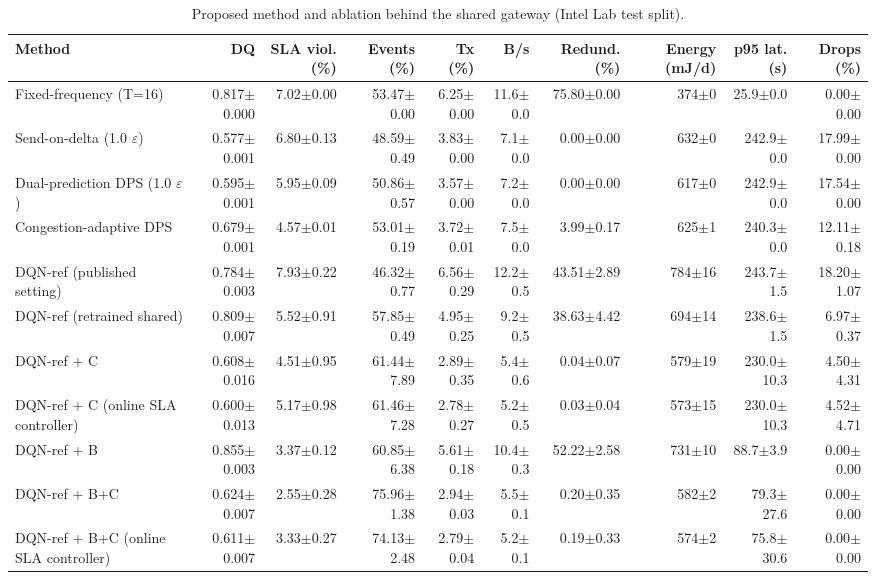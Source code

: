 \begin{table}[t]
\centering
\caption{Proposed method and ablation behind the shared gateway (Intel Lab test split).}
\label{tab:ablation}
\footnotesize
\begin{tabular}{lrrrrrrrrr}
\toprule
Method & DQ & SLA viol. (\%) & Events (\%) & Tx (\%) & B/s & Redund. (\%) & Energy (mJ/d) & p95 lat. (s) & Drops (\%) \\
\midrule
Fixed-frequency (T=16) & 0.817$\pm$0.000 & 7.02$\pm$0.00 & 53.47$\pm$0.00 & 6.25$\pm$0.00 & 11.6$\pm$0.0 & 75.80$\pm$0.00 & 374$\pm$0 & 25.9$\pm$0.0 & 0.00$\pm$0.00 \\
Send-on-delta (1.0 $\varepsilon$) & 0.577$\pm$0.001 & 6.80$\pm$0.13 & 48.59$\pm$0.49 & 3.83$\pm$0.00 & 7.1$\pm$0.0 & 0.00$\pm$0.00 & 632$\pm$0 & 242.9$\pm$0.0 & 17.99$\pm$0.00 \\
Dual-prediction DPS (1.0 $\varepsilon$) & 0.595$\pm$0.001 & 5.95$\pm$0.09 & 50.86$\pm$0.57 & 3.57$\pm$0.00 & 7.2$\pm$0.0 & 0.00$\pm$0.00 & 617$\pm$0 & 242.9$\pm$0.0 & 17.54$\pm$0.00 \\
Congestion-adaptive DPS & 0.679$\pm$0.001 & 4.57$\pm$0.01 & 53.01$\pm$0.19 & 3.72$\pm$0.01 & 7.5$\pm$0.0 & 3.99$\pm$0.17 & 625$\pm$1 & 240.3$\pm$0.0 & 12.11$\pm$0.18 \\
DQN-ref (published setting) & 0.784$\pm$0.003 & 7.93$\pm$0.22 & 46.32$\pm$0.77 & 6.56$\pm$0.29 & 12.2$\pm$0.5 & 43.51$\pm$2.89 & 784$\pm$16 & 243.7$\pm$1.5 & 18.20$\pm$1.07 \\
DQN-ref (retrained shared) & 0.809$\pm$0.007 & 5.52$\pm$0.91 & 57.85$\pm$0.49 & 4.95$\pm$0.25 & 9.2$\pm$0.5 & 38.63$\pm$4.42 & 694$\pm$14 & 238.6$\pm$1.5 & 6.97$\pm$0.37 \\
DQN-ref + C & 0.608$\pm$0.016 & 4.51$\pm$0.95 & 61.44$\pm$7.89 & 2.89$\pm$0.35 & 5.4$\pm$0.6 & 0.04$\pm$0.07 & 579$\pm$19 & 230.0$\pm$10.3 & 4.50$\pm$4.31 \\
DQN-ref + C (online SLA controller) & 0.600$\pm$0.013 & 5.17$\pm$0.98 & 61.46$\pm$7.28 & 2.78$\pm$0.27 & 5.2$\pm$0.5 & 0.03$\pm$0.04 & 573$\pm$15 & 230.0$\pm$10.3 & 4.52$\pm$4.71 \\
DQN-ref + B & 0.855$\pm$0.003 & 3.37$\pm$0.12 & 60.85$\pm$6.38 & 5.61$\pm$0.18 & 10.4$\pm$0.3 & 52.22$\pm$2.58 & 731$\pm$10 & 88.7$\pm$3.9 & 0.00$\pm$0.00 \\
DQN-ref + B+C & 0.624$\pm$0.007 & 2.55$\pm$0.28 & 75.96$\pm$1.38 & 2.94$\pm$0.03 & 5.5$\pm$0.1 & 0.20$\pm$0.35 & 582$\pm$2 & 79.3$\pm$27.6 & 0.00$\pm$0.00 \\
DQN-ref + B+C (online SLA controller) & 0.611$\pm$0.007 & 3.33$\pm$0.27 & 74.13$\pm$2.48 & 2.79$\pm$0.04 & 5.2$\pm$0.1 & 0.19$\pm$0.33 & 574$\pm$2 & 75.8$\pm$30.6 & 0.00$\pm$0.00 \\

\end{tabular}
\end{table}
